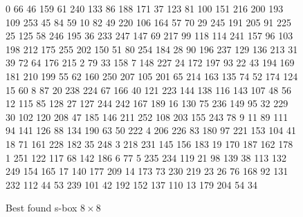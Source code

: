 \begin{center}
{\begin{figure}
\begin{minipage}{\textwidth}
0 66 46 159 61 240 133 86 188 171 37 123 81 100 151
216 200 193 109 253 45 84 59 10 82 49 220 106 164
57 70 29 245 191 205 91 225 25 125 58 246 195 36
233 247 147 69 217 99 118 114 241 157 96 103 198
212 175 255 202 150 51 80 254 184 28 90 196 237 129
136 213 31 39 72 64 176 215 2 79 33 158 7 148 227
24 172 197 93 22 43 194 169 181 210 199 55 62 160
250 207 105 201 65 214 163 135 74 52 174 124 15
60 8 87 20 238 224 67 166 40 121 223 144 138
116 143 107 48 56 12 115 85 128 27 127 244 242 167
189 16 130 75 236 149 95 32 229 30 102 120 208 47
185 146 211 252 108 203 155 243 78 9 11 89 111 94
141 126 88 134 190 63 50 222 4 206 226 83 180 97 221
153 104 41 18 71 161 228 182 35 248 3 218 231 145 156
183 19 170 187 162 178 1 251 122 117 68 142 186 6 77
5 235 234 119 21 98 139 38 113 132 249 154 165 17 140
177 209 14 173 73 230 219 23 26 76 168 92 131 232 112
44 53 239 101 42 192 152 137 110 13 179 204 54 34
\end{minipage}
\caption{Best found s-box $8 \times 8$}
\label{good88Box}
\end{figure}

\twocolumn

}
\end{center}
